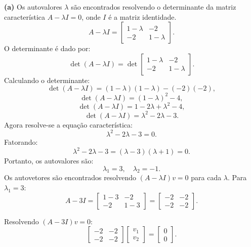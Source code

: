 \begin{resolution}

  {\bf (a)} \; Os autovalores \(\lambda\) são encontrados resolvendo o determinante da matriz característica \( A - \lambda I = 0 \), onde \( I \) é a matriz identidade.
  \[
    A - \lambda I =
    \begin{bmatrix}
      1 - \lambda & -2          \\
      -2          & 1 - \lambda
    \end{bmatrix}.
  \]
  O determinante é dado por:
  \[
    \det(A - \lambda I) = \det\begin{bmatrix}
      1 - \lambda & -2          \\
      -2          & 1 - \lambda
    \end{bmatrix}.
  \]
  Calculando o determinante:
  \[
    \det(A - \lambda I) = (1 - \lambda)(1 - \lambda) - (-2)(-2),
  \]
  \[
    \det(A - \lambda I) = (1 - \lambda)^2 - 4,
  \]
  \[
    \det(A - \lambda I) = 1 - 2\lambda + \lambda^2 - 4,
  \]
  \[
    \det(A - \lambda I) = \lambda^2 - 2\lambda - 3.
  \]
  Agora resolve-se a equação característica:
  \[
    \lambda^2 - 2\lambda - 3 = 0.
  \]
  Fatorando:
  \[
    \lambda^2 - 2\lambda - 3 = (\lambda - 3)(\lambda + 1) = 0.
  \]
  Portanto, os autovalores são:
  \[
    \lambda_1 = 3, \quad \lambda_2 = -1.
  \]
  Os autovetores são encontrados resolvendo \((A - \lambda I)v = 0\) para cada \(\lambda\). Para \(\lambda_1 = 3\):
  \[
    A - 3I = \begin{bmatrix}
      1 - 3 & -2    \\
      -2    & 1 - 3
    \end{bmatrix}
    = \begin{bmatrix}
      -2 & -2 \\
      -2 & -2
    \end{bmatrix}.
  \]

  Resolvendo \((A - 3I)v = 0\):
  \[
    \begin{bmatrix}
      -2 & -2 \\
      -2 & -2
    \end{bmatrix}
    \begin{bmatrix}
      v_1 \\ v_2
    \end{bmatrix}
    = \begin{bmatrix}
      0 \\ 0
    \end{bmatrix}.
  \]


\end{resolution}
